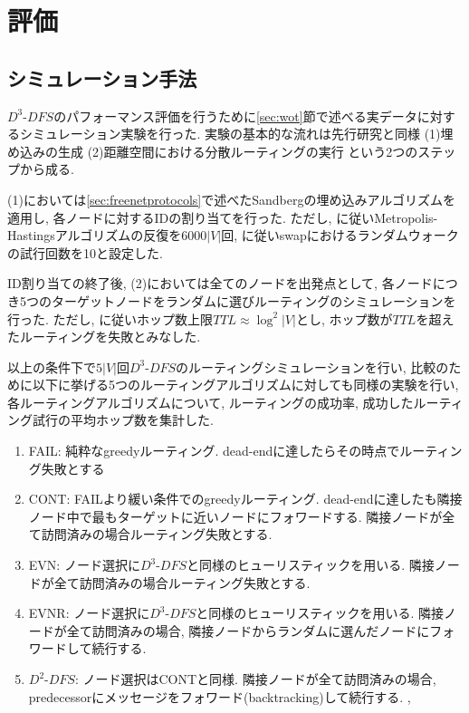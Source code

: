 \documentclass[dvipdfmx]{ampbt}
\begin{document}
\section{評価}
  \subsection{シミュレーション手法}
  $D^3$-$DFS$のパフォーマンス評価を行うために\ref{sec:wot}節で述べる実データに対するシミュレーション実験を行った. 実験の基本的な流れは先行研究と同様 (1)埋め込みの生成 (2)距離空間における分散ルーティングの実行 という2つのステップから成る.

  (1)においては\ref{sec:freenetprotocols}で述べたSandbergの埋め込みアルゴリズムを適用し, 各ノードに対するIDの割り当てを行った. ただし, \cite{sandberg2006distributed}に従いMetropolis-Hastingsアルゴリズムの反復を$6000|V|$回, \cite{roos2016analyzing}に従い\gls{swap}におけるランダムウォークの試行回数を10と設定した.

  ID割り当ての終了後, (2)においては全てのノードを出発点として, 各ノードにつき5つのターゲットノードをランダムに選びルーティングのシミュレーションを行った. ただし\cite{sandberg2006distributed}, \cite{schiller2011attack}に従いホップ数上限$TTL\approx \log^2|V|$とし, ホップ数が$TTL$を超えたルーティングを失敗とみなした.

  以上の条件下で$5|V|$回$D^3$-$DFS$のルーティングシミュレーションを行い, 比較のために以下に挙げる5つのルーティングアルゴリズムに対しても同様の実験を行い, 各ルーティングアルゴリズムについて, ルーティングの成功率, 成功したルーティング試行の平均ホップ数を集計した.

   \begin{enumerate}[label=(\alph*)]
    \item FAIL: 純粋なgreedyルーティング. dead-endに達したらその時点でルーティング失敗とする\cite{sandberg2006distributed}
    \item CONT: FAILより緩い条件でのgreedyルーティング. dead-endに達したも隣接ノード中で最もターゲットに近いノードにフォワードする. 隣接ノードが全て訪問済みの場合ルーティング失敗とする. \cite{sandberg2006distributed}
    \item EVN: ノード選択に$D^3$-$DFS$と同様のヒューリスティックを用いる. 隣接ノードが全て訪問済みの場合ルーティング失敗とする. 
    \item EVNR: ノード選択に$D^3$-$DFS$と同様のヒューリスティックを用いる. 隣接ノードが全て訪問済みの場合, 隣接ノードからランダムに選んだノードにフォワードして続行する. \cite{csimcsek2008navigating}
    \item $D^2$-$DFS$: ノード選択はCONTと同様. 隣接ノードが全て訪問済みの場合, predecessorにメッセージをフォワード(backtracking)して続行する. \cite{clarke2001freenet}, \cite{clarke2010private}
   \end{enumerate}
\end{document}
